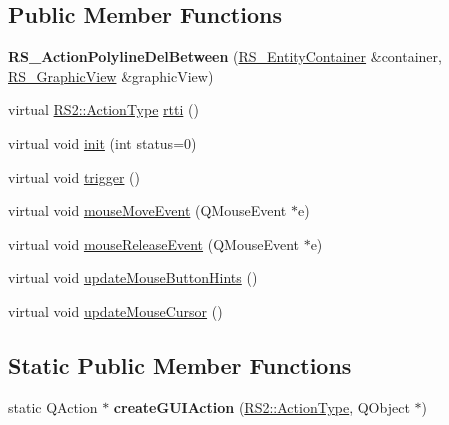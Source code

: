 \subsection*{Public Member Functions}
\begin{DoxyCompactItemize}
\item 
\hypertarget{classRS__ActionPolylineDelBetween_a72a9d1b905b499b6fbafb103471b72db}{{\bfseries R\-S\-\_\-\-Action\-Polyline\-Del\-Between} (\hyperlink{classRS__EntityContainer}{R\-S\-\_\-\-Entity\-Container} \&container, \hyperlink{classRS__GraphicView}{R\-S\-\_\-\-Graphic\-View} \&graphic\-View)}\label{classRS__ActionPolylineDelBetween_a72a9d1b905b499b6fbafb103471b72db}

\item 
virtual \hyperlink{classRS2_afe3523e0bc41fd637b892321cfc4b9d7}{R\-S2\-::\-Action\-Type} \hyperlink{classRS__ActionPolylineDelBetween_adb50eebb5e9daaf15381b9fc84567257}{rtti} ()
\item 
virtual void \hyperlink{classRS__ActionPolylineDelBetween_a39371e2cb69b485571449e8917366410}{init} (int status=0)
\item 
virtual void \hyperlink{classRS__ActionPolylineDelBetween_a3b5a203971587b7085b197dee552a415}{trigger} ()
\item 
virtual void \hyperlink{classRS__ActionPolylineDelBetween_a60ef0baae2a709852b8245b7b7422242}{mouse\-Move\-Event} (Q\-Mouse\-Event $\ast$e)
\item 
virtual void \hyperlink{classRS__ActionPolylineDelBetween_a2a1d2683838e8c8a2b8bdd1ddd583ee1}{mouse\-Release\-Event} (Q\-Mouse\-Event $\ast$e)
\item 
virtual void \hyperlink{classRS__ActionPolylineDelBetween_ac6e1180be4cbecccd32c124d697cfa26}{update\-Mouse\-Button\-Hints} ()
\item 
virtual void \hyperlink{classRS__ActionPolylineDelBetween_a889962ad689e09ec8561ff237e76876f}{update\-Mouse\-Cursor} ()
\end{DoxyCompactItemize}
\subsection*{Static Public Member Functions}
\begin{DoxyCompactItemize}
\item 
\hypertarget{classRS__ActionPolylineDelBetween_abbe86dc47fdeb3164fdfc8d1997bb707}{static Q\-Action $\ast$ {\bfseries create\-G\-U\-I\-Action} (\hyperlink{classRS2_afe3523e0bc41fd637b892321cfc4b9d7}{R\-S2\-::\-Action\-Type}, Q\-Object $\ast$)}\label{classRS__ActionPolylineDelBetween_abbe86dc47fdeb3164fdfc8d1997bb707}

\end{DoxyCompactItemize}

